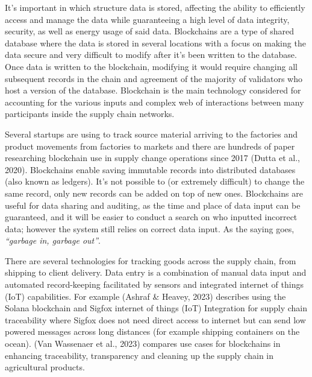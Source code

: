 \documentclass[
  12pt,
  letterpaper,
  DIV=11,
  numbers=noendperiod]{scrartcl}
\begin{document}
It's important in which structure data is stored, affecting the ability
to efficiently access and manage the data while guaranteeing a high
level of data integrity, security, as well as energy usage of said data.
Blockchains are a type of shared database where the data is stored in
several locations with a focus on making the data secure and very
difficult to modify after it's been written to the database. Once data
is written to the blockchain, modifying it would require changing all
subsequent records in the chain and agreement of the majority of
validators who host a version of the database. Blockchain is the main
technology considered for accounting for the various inputs and complex
web of interactions between many participants inside the supply chain
networks.

Several startups are using to track source material arriving to the
factories and product movements from factories to markets and there are
hundreds of paper researching blockchain use in supply change operations
since 2017 (Dutta et al., 2020). Blockchains enable saving immutable
records into distributed databases (also known as ledgers). It's not
possible to (or extremely difficult) to change the same record, only new
records can be added on top of new ones. Blockchains are useful for data
sharing and auditing, as the time and place of data input can be
guaranteed, and it will be easier to conduct a search on who inputted
incorrect data; however the system still relies on correct data input.
As the saying goes, \emph{``garbage in, garbage out''}.

There are several technologies for tracking goods across the supply
chain, from shipping to client delivery. Data entry is a combination of
manual data input and automated record-keeping facilitated by sensors
and integrated internet of things (IoT) capabilities. For example
(Ashraf \& Heavey, 2023) describes using the Solana blockchain and
Sigfox internet of things (IoT) Integration for supply chain
traceability where Sigfox does not need direct access to internet but
can send low powered messages across long distances (for example
shipping containers on the ocean). (Van Wassenaer et al., 2023) compares
use cases for blockchains in enhancing traceability, transparency and
cleaning up the supply chain in agricultural products.

\def\pandoctableshortcapt{A Sample of Blockchain-based Supply Chain
Companies}
\end{document}
